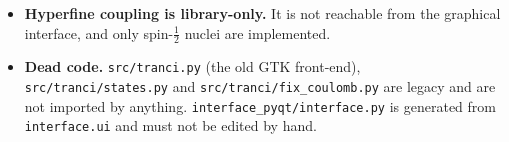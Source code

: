 \documentclass[11pt,a4paper]{article}
\newcommand{\op}[1]{\texttt{#1}}
\begin{document}
\begin{itemize}
\item \textbf{Hyperfine coupling is library-only.}  It is not reachable from the
      graphical interface, and only spin-$\tfrac12$ nuclei are implemented.

\item \textbf{Dead code.}  \op{src/tranci.py} (the old GTK front-end),
      \op{src/tranci/states.py} and \op{src/tranci/fix\_coulomb.py} are legacy
      and are not imported by anything.  \op{interface\_pyqt/interface.py} is
      generated from \op{interface.ui} and must not be edited by hand.
\end{itemize}
\end{document}
